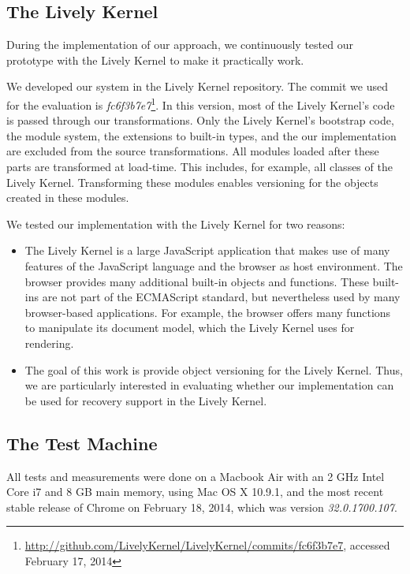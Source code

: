 \subsection{The Lively Kernel}

During the implementation of our approach, we continuously tested our prototype with the Lively Kernel to make it practically work.

We developed our system in the Lively Kernel repository.
The commit we used for the evaluation is \emph{fc6f3b7e7}\footnote{\url{http://github.com/LivelyKernel/LivelyKernel/commits/fc6f3b7e7}, accessed February 17, 2014}. In this version, most of the Lively Kernel's code is passed through our transformations.
Only the Lively Kernel's bootstrap code, the module system, the extensions to built-in types, and the our implementation are excluded from the source transformations.
All modules loaded after these parts are transformed at load-time.
This includes, for example, all classes of the Lively Kernel.
Transforming these modules enables versioning for the objects created in these modules.

We tested our implementation with the Lively Kernel for two reasons:

\begin{itemize}
    \item The Lively Kernel is a large JavaScript application that makes use of many features of the JavaScript language and the browser as host environment. The browser provides many additional built-in objects and functions. These built-ins are not part of the ECMAScript standard, but nevertheless used by many browser-based applications. For example, the browser offers many functions to manipulate its document model, which the Lively Kernel uses for rendering.
    \item The goal of this work is provide object versioning for the Lively Kernel. Thus, we are particularly interested in evaluating whether our implementation can be used for recovery support in the Lively Kernel.
\end{itemize}


\subsection{The Test Machine}

All tests and measurements were done on a Macbook Air with an 2 GHz Intel Core i7 and 8 GB main memory, using Mac OS X 10.9.1, and the most recent stable release of Chrome on February 18, 2014, which was version \emph{32.0.1700.107}.

